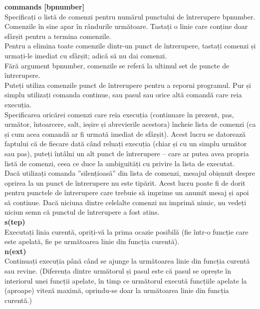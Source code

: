 \documentclass[oneside,20pt]{article}          %
\begin{document}
\textbf{commands [bpnumber]}\\
Specificați o listă de comenzi pentru numărul punctului de întrerupere bpnumber. Comenzile în sine apar în rândurile următoare. Tastați o linie care conține doar sfârșit pentru a termina comenzile.\\

Pentru a elimina toate comenzile dintr-un punct de întrerupere, tastați comenzi și urmați-le imediat cu sfârșit; adică să nu dai comenzi.\\

Fără argument bpnumber, comenzile se referă la ultimul set de puncte de întrerupere.\\

Puteți utiliza comenzile punct de întrerupere pentru a reporni programul. Pur și simplu utilizați comanda continue, sau pasul sau orice altă comandă care reia execuția.\\

Specificarea oricărei comenzi care reia execuția (continuare în prezent, pas, următor, întoarcere, salt, ieșire și abrevierile acestora) încheie lista de comenzi (ca și cum acea comandă ar fi urmată imediat de sfârșit). Acest lucru se datorează faptului că de fiecare dată când reluați execuția (chiar și cu un simplu următor sau pas), puteți întâlni un alt punct de întrerupere – care ar putea avea propria listă de comenzi, ceea ce duce la ambiguități cu privire la lista de executat.\\

Dacă utilizați comanda ”silențioasă” din lista de comenzi, mesajul obișnuit despre oprirea la un punct de întrerupere nu este tipărit. Acest lucru poate fi de dorit pentru punctele de întrerupere care trebuie să imprime un anumit mesaj și apoi să continue. Dacă niciuna dintre celelalte comenzi nu imprimă nimic, nu vedeți niciun semn că punctul de întrerupere a fost atins.\\

\textbf{s(tep)}\\
Executați linia curentă, opriți-vă la prima ocazie posibilă (fie într-o funcție care este apelată, fie pe următoarea linie din funcția curentă).\\

\textbf{n(ext)}\\
Continuați execuția până când se ajunge la următoarea linie din funcția curentă sau revine. (Diferența dintre următorul și pasul este că pasul se oprește în interiorul unei funcții apelate, în timp ce următorul execută funcțiile apelate la (aproape) viteză maximă, oprindu-se doar la următoarea linie din funcția curentă.)\\
\end{document}
